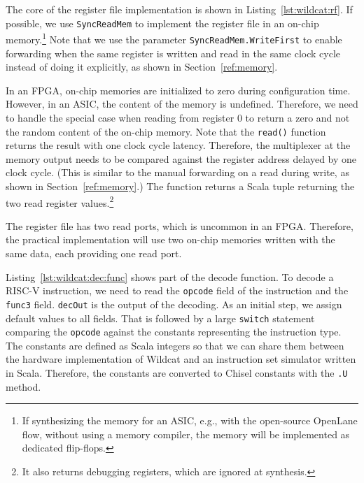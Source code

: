 \documentclass[%
    10pt,
    headinclude, footexclude,
    openright, %
    notitlepage,
    cleardoubleempty,
    headsepline,
    pointlessnumbers,
    bibtotoc, idxtotoc,
    ]{scrbook}
\newcommand{\code}[1]{{\lstinline[basicstyle=\small\ttfamily]{#1}}}
\begin{document}

The core of the register file implementation is shown in Listing~\ref{lst:wildcat:rf}.
If possible, we use \code{SyncReadMem} to implement the register file in an on-chip memory.\footnote{If synthesizing the memory for an ASIC, e.g., with the open-source
OpenLane flow, without using a memory compiler, the memory will be implemented as
dedicated flip-flops.}
Note that we use the parameter \code{SyncReadMem.WriteFirst} to enable forwarding
when the same register is written and read in the same clock cycle instead of
doing it explicitly, as shown in Section~\ref{ref:memory}.

In an FPGA, on-chip memories are initialized to zero during configuration time.
However, in an ASIC, the content of the memory is undefined.
Therefore, we need to handle the special case when reading from register 0
to return a zero and not the random content of the on-chip memory.
Note that the \code{read()} function returns the result with one clock
cycle latency. Therefore, the multiplexer at the memory output
needs to be compared against the register address delayed by one clock cycle.
(This is similar to the manual forwarding on a read during write,
as shown in Section~\ref{ref:memory}.)
The function returns a Scala tuple returning the two read register
values.\footnote{It also returns debugging registers,
which are ignored at synthesis.}

The register file has two read ports, which is uncommon in an FPGA.
Therefore, the practical implementation will use two on-chip memories
written with the same data, each providing one read port.

 

Listing~\ref{lst:wildcat:dec:func} shows part of the decode function.
To decode a RISC-V instruction, we need to read the \code{opcode} field of
the instruction and the \code{func3} field. \code{decOut} is the output of
the decoding. As an initial step, we assign default values to all fields.
That is followed by a large \code{switch} statement comparing the \code{opcode}
against the constants representing the instruction type.
The constants are defined as Scala integers so that we can share them between the
hardware implementation of Wildcat and an instruction set simulator written in Scala.
Therefore, the constants are converted to Chisel constants with the \code{.U} method.
\end{document}
